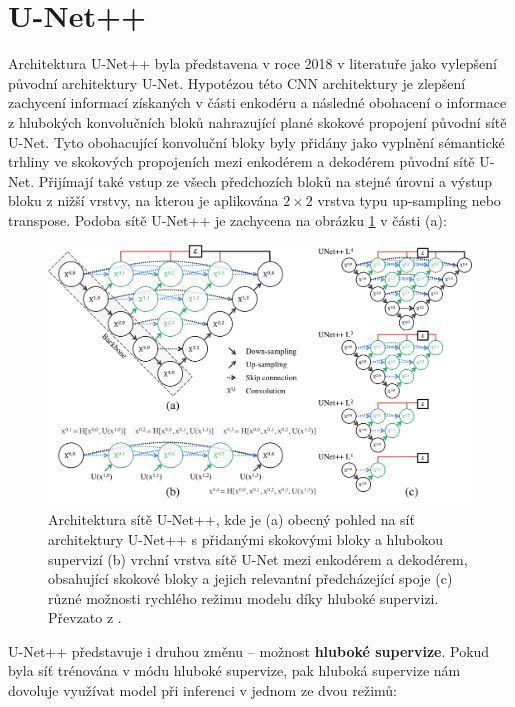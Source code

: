 \section{U-Net++}
\label{sec:Chapter23}

Architektura U-Net++ byla představena v roce 2018 v literatuře \cite{unetpp} jako vylepšení původní architektury U-Net. Hypotézou této CNN architektury je zlepšení zachycení informací získaných v části enkodéru a následné obohacení o informace z hlubokých konvolučních bloků nahrazující plané skokové propojení původní sítě U-Net. Tyto obohacující konvoluční bloky byly přidány jako vyplnění sémantické trhliny ve skokových propojeních mezi enkodérem a dekodérem původní sítě U-Net. Přijímají také vstup ze všech předchozích bloků na stejné úrovni a výstup bloku z nižší vrstvy, na kterou je aplikována $2\times2$ vrstva typu up-sampling nebo transpose. Podoba sítě U-Net++ je zachycena na obrázku \ref{fig:unetpp} v části (a):

\begin{figure}[H]
\centering
\includegraphics[width=1.0\textwidth,keepaspectratio]{Figures/unetpp.png}
\caption[Architektura sítě U-Net++]
{Architektura sítě U-Net++, kde je (a) obecný pohled na síť architektury U-Net++ s přidanými skokovými bloky a hlubokou supervizí \uppercase\expandafter{ \relax} (b) vrchní vrstva sítě U-Net mezi enkodérem a dekodérem, obsahující skokové bloky a jejich relevantní předcházející spoje (c) různé možnosti rychlého režimu modelu díky hluboké supervizi. Převzato z \cite{unetpp}. }
\label{fig:unetpp}
\end{figure}

U-Net++ představuje i druhou změnu -- možnost \textbf{hluboké supervize}. Pokud byla síť trénována v módu hluboké supervize, pak hluboká supervize nám dovoluje využívat model při inferenci v jednom ze dvou režimů:


